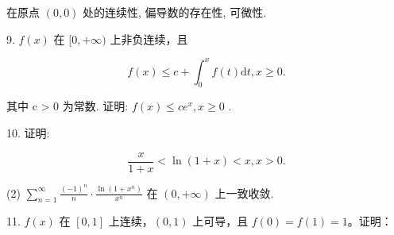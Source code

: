 \documentclass{examcollection}
\renewcommand{\displayformula}[1]{\[#1\]}
\begin{document}
{\begin{minipage}{\textwidth}
在原点 $(0,0)$ 处的连续性, 偏导数的存在性, 可微性.\par
9. $f(x)$ 在 $[0, +\infty)$ 上非负连续，且\par
\displayformula{f (x) \leq c + \int_ {0} ^ {x} f (t) \mathrm{d} t, x \geq 0.}\par
其中 c > 0 为常数. 证明:  $f(x) \leq ce^{x}, x \geq 0$ .\par
10. 证明:\par
\displayformula{\frac {x}{1 + x} <   \ln (1 + x) <   x, x > 0. \tag {1}}\par
(2) $\sum_{n=1}^{\infty} \frac{(-1)^n}{n} \cdot \frac{\ln(1 + x^n)}{x^n}$ 在 $(0, +\infty)$ 上一致收敛.\par
11. $f(x)$ 在 $[0,1]$ 上连续，$(0,1)$ 上可导，且 $f(0) = f(1) = 1$。证明：\par
\end{minipage}}
\ifdim\dimexpr\ht\proofbox+\dp\proofbox\relax>\textheight
\noindent\resizebox{!}{\textheight}{\usebox{\proofbox}}\else\noindent\usebox{\proofbox}\fi\clearpage
\end{document}
